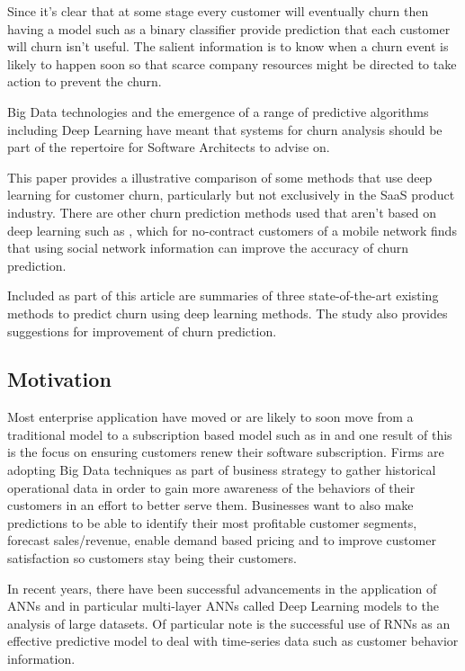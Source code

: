 \documentclass[final,a4paper,peerreviewca]{IEEEtran}
\begin{document}
Since it's clear that at some stage every customer will eventually churn then having a model such as a binary classifier provide prediction that each customer will churn isn't useful. The salient information is to know when a churn event is likely to happen soon so that scarce company resources might be directed to take action to prevent the churn.

Big Data technologies and the emergence of a range of predictive algorithms including Deep Learning \citep{LeCun:2015} have meant that systems for churn analysis should be part of the repertoire for Software Architects to advise on.

This paper provides a illustrative comparison of some methods that use deep learning for customer churn, particularly but not exclusively in the SaaS product industry. There are other churn prediction methods used that aren't based on deep learning such as \citep{Backiel:2016}, which for no-contract customers of a mobile network finds that using social network information can improve the accuracy of churn prediction. 

Included as part of this article are summaries of three state-of-the-art existing methods to predict churn using deep learning methods. The study also provides suggestions for improvement of churn prediction.

\subsection{Motivation}
Most enterprise application have moved or are likely to soon move from a traditional model to a subscription based model such as in \citep{Pettey:2015} and one result of this is the focus on ensuring customers renew their software subscription. Firms are adopting Big Data techniques as part of business strategy \citep{HBR:2017} to gather historical operational data in order to gain more awareness of the behaviors of their customers in an effort to better serve them. Businesses want to also make predictions \citep{Hausman:2017} to be able to identify their most profitable customer segments, forecast sales/revenue, enable demand based pricing and to improve customer satisfaction so customers stay being their customers. 

In recent years, there have been successful advancements in the application of ANNs and in particular multi-layer ANNs called Deep Learning models to the analysis of large datasets. Of particular note is the successful use of RNNs \citep{Karpathy:2015} as an effective predictive model to deal with time-series data such as customer behavior information.
\end{document}
